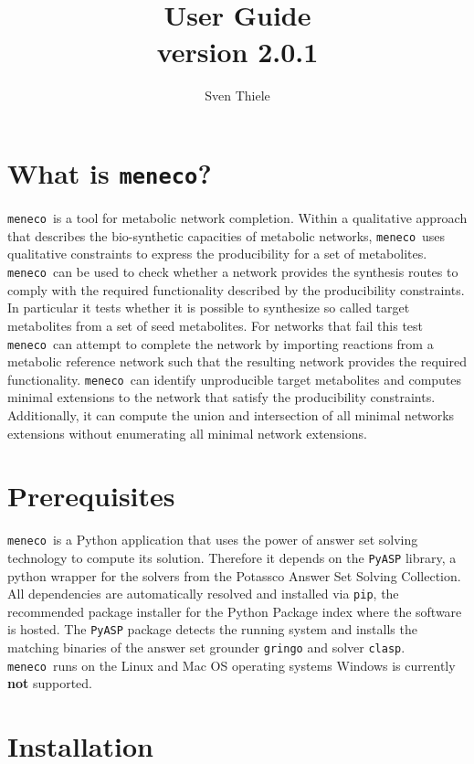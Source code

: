 \documentclass{article}
\title{ \meneco  \\
User Guide \\
version 2.0.1
}
\author{Sven Thiele}
\date{}
\newcommand\meneco{\texttt{meneco}}
\begin{document}
\maketitle

\section{What is \meneco?}

\meneco\ is a tool for metabolic network completion.
Within a qualitative approach that describes the bio-synthetic capacities of metabolic networks,
 \meneco\ uses qualitative constraints to express the producibility for a set of metabolites.
\meneco\ can be used to check whether a network provides the synthesis routes to comply
 with the required functionality described by the producibility constraints.
In particular it tests whether it is possible to synthesize so called target metabolites from a set of seed metabolites.
For networks that fail this test \meneco\ can attempt to complete the network by importing reactions
from a metabolic reference network such that the resulting network provides the required functionality.
\meneco\ can identify unproducible target metabolites and computes minimal extensions to the network that satisfy the producibility constraints.
Additionally, it can compute the union and intersection of all minimal networks extensions without enumerating all minimal network extensions.


\section{Prerequisites}
\meneco\ is a Python application that uses the power of answer set solving technology to compute its solution.
Therefore it depends on the \texttt{PyASP} library, a python wrapper for the solvers from the Potassco Answer Set Solving Collection.
All dependencies are automatically resolved and installed via \texttt{pip}, the recommended package installer for the Python Package index where the software is hosted.
The \texttt{PyASP} package detects the running system and installs the matching binaries of the answer set grounder \texttt{gringo} and solver \texttt{clasp}.
\meneco\ runs on the Linux and Mac OS operating systems Windows is currently {\bf not} supported.


\section{Installation}
\end{document}
